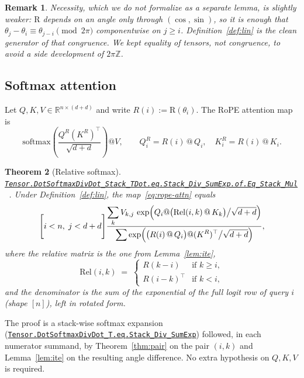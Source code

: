 \documentclass[11pt,a4paper]{article}
\newcommand{\lmod}[1]{\href{http://www.lemma.cn/lean/?module=#1}{\nolinkurl{#1}}}
\newtheorem{theorem}{Theorem}[section]
\newtheorem{remark}[theorem]{Remark}
\newcommand{\R}{\mathbb{R}}
\newcommand{\rot}{\mathrm{R}}
\newcommand{\softmax}{\mathrm{softmax}}
\newcommand{\Rel}{\mathrm{Rel}}
\begin{document}
\begin{remark}
Necessity, which we do not formalize as a separate lemma, is slightly weaker: \(\rot\) depends on an angle only through \((\cos,\sin)\), so it is enough that
\(\theta_j-\theta_i\equiv\theta_{j-i}\pmod{2\pi}\)
componentwise on \(j\ge i\).
Definition~\ref{def:lin} is the clean generator of that congruence.
We kept equality of tensors, not congruence, to avoid a side development of \(2\pi\mathbb{Z}\).
\end{remark}

\subsection{Softmax attention}

Let \(Q,K,V\in\R^{n\times(d+d)}\) and write
\(R(i):=\rot(\theta_i)\).
The RoPE attention map is
\begin{equation}
  \label{eq:rope-attn}
  \softmax\!\left(\frac{Q^R (K^R)^\top}{\sqrt{d+d}}\right) @ V,
  \qquad
  Q^R_i = R(i)\,@\,Q_i,\quad
  K^R_i = R(i)\,@\,K_i.
\end{equation}

\begin{theorem}[Relative softmax]
\label{thm:soft}
\lmod{Tensor.DotSoftmaxDivDot_Stack_TDot.eq.Stack_Div_SumExp.of.Eq_Stack_Mul}~\cite{lemma_rope_rel}.
Under Definition~\ref{def:lin}, the map~\eqref{eq:rope-attn} equals
\begin{equation}
  \label{eq:soft}
  \Biggl[
    i < n,\;
    j < d+d
  \Biggr]
  \frac{
    \displaystyle\sum_{k}
      V_{k,j}\,
      \exp\Bigl(
        Q_i @ \bigl(\Rel(i,k)\,@\,K_k\bigr)
        \big/\sqrt{d+d}
      \Bigr)
  }{
    \displaystyle
      \sum\exp\Bigl(
        \bigl(R(i)\,@\,Q_i\bigr)
        @
        (K^R)^\top
        \big/\sqrt{d+d}
      \Bigr)
  },
\end{equation}
where the relative matrix is the one from Lemma~\ref{lem:ite},
\begin{equation}
  \label{eq:rel}
  \Rel(i,k)
  \;=\;
  \begin{cases}
    R(k-i) & \text{if }k\ge i,\\
    R(i-k)^\top & \text{if }k<i,
  \end{cases}
\end{equation}
and the denominator is the sum of the exponential of the full logit row of query \(i\) (shape \([n]\)), left in rotated form.
\end{theorem}

The proof is a stack-wise softmax expansion
(\lmod{Tensor.DotSoftmaxDivDot_T.eq.Stack_Div_SumExp})
followed, in each numerator summand, by Theorem~\ref{thm:pair} on the pair \((i,k)\) and Lemma~\ref{lem:ite} on the resulting angle difference.
No extra hypothesis on \(Q,K,V\) is required.
\end{document}
